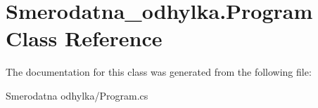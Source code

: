 \hypertarget{class_smerodatna__odhylka_1_1_program}{}\section{Smerodatna\+\_\+odhylka.\+Program Class Reference}
\label{class_smerodatna__odhylka_1_1_program}


The documentation for this class was generated from the following file\+:\begin{DoxyCompactItemize}
\item 
Smerodatna odhylka/Program.\+cs\end{DoxyCompactItemize}
